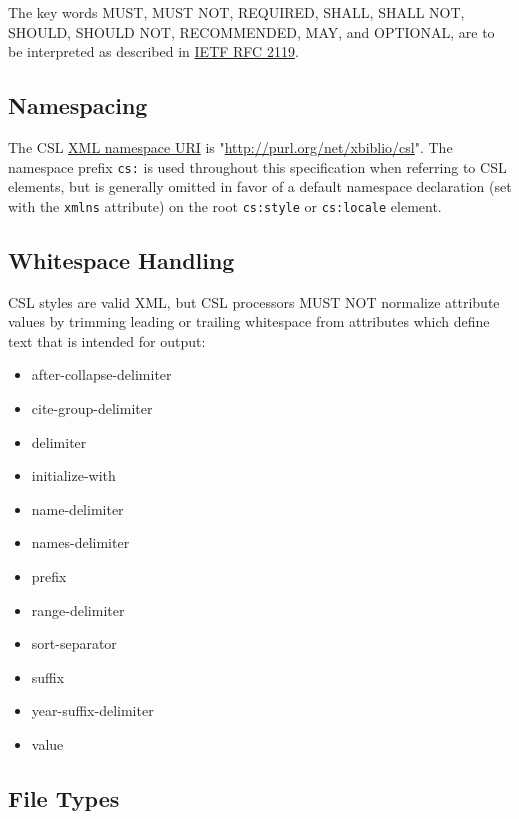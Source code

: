 The key words MUST, MUST NOT, REQUIRED, SHALL, SHALL NOT, SHOULD, SHOULD
NOT, RECOMMENDED, MAY, and OPTIONAL, are to be interpreted as described
in \href{http://tools.ietf.org/html/rfc2119}{IETF RFC 2119}.

\hypertarget{namespacing}{%
\subsection{Namespacing}\label{namespacing}}

The CSL \href{http://en.wikipedia.org/wiki/XML_Namespace}{XML namespace
URI} is "\url{http://purl.org/net/xbiblio/csl}". The namespace prefix
\texttt{cs:} is used throughout this specification when referring to CSL
elements, but is generally omitted in favor of a default namespace
declaration (set with the \texttt{xmlns} attribute) on the root
\texttt{cs:style} or \texttt{cs:locale} element.

\hypertarget{whitespace-handling}{%
\subsection{Whitespace Handling}\label{whitespace-handling}}

CSL styles are valid XML, but CSL processors MUST NOT normalize
attribute values by trimming leading or trailing whitespace from
attributes which define text that is intended for output:

\begin{itemize}
\tightlist
\item
  after-collapse-delimiter
\item
  cite-group-delimiter
\item
  delimiter
\item
  initialize-with
\item
  name-delimiter
\item
  names-delimiter
\item
  prefix
\item
  range-delimiter
\item
  sort-separator
\item
  suffix
\item
  year-suffix-delimiter
\item
  value
\end{itemize}

\hypertarget{file-types}{%
\subsection{File Types}\label{file-types}}

